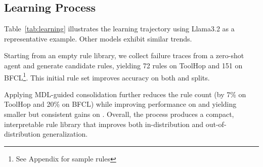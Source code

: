

\subsection{Learning Process}

Table~\ref{tab:learning} illustrates the learning trajectory using Llama3.2 as a representative
example. Other models exhibit similar trends. 

Starting from an empty rule
library, we collect failure traces from a zero-shot agent and generate candidate rules, yielding 72 rules on ToolHop and 151 on BFCL\footnote{See Appendix for sample rules}. 
This initial rule set improves accuracy on both \rand and
\unseen splits. 

Applying MDL-guided consolidation further reduces the rule count (by 7\% on ToolHop and 20\% on BFCL) while
improving performance on \rand and yielding smaller but consistent gains on \unseen.
Overall, the process produces a compact, interpretable rule library that improves both
in-distribution and out-of-distribution generalization.
